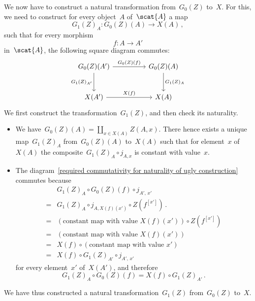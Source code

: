 We now have to construct a natural transformation from~$G_0(Z)$ to~$X$.
For this, we need to construct for every object~$A$ of~$\scat{A}$ a map
\[
	G_1(Z)_A \colon G_0(Z)(A) \to X(A) \,,
\]
such that for every morphism
\[
	f \colon A \to A'
\]
in~$\scat{A}$, the following square diagram commutes:
\begin{equation}
	\label{required commutativity for naturality of ugly construction}
	\begin{tikzcd}[row sep = large, column sep = huge]
		G_0(Z)(A')
		\arrow{r}[above]{G_0(Z)(f)}
		\arrow{d}[left]{G_1(Z)_{A'}}
		&
		G_0(Z)(A)
		\arrow{d}[right]{G_1(Z)_A}
		\\
		X(A')
		\arrow{r}[above]{X(f)}
		&
		X(A)
	\end{tikzcd}
\end{equation}
We first construct the transformation~$G_1(Z)$, and then check its naturality.
\begin{itemize}

	\item
		We have~$G_0(Z)(A) = ∐_{x ∈ X(A)} Z(A, x)$.
		There hence exists a unique map~$G_1(Z)_A$ from~$G_0(Z)(A)$ to~$X(A)$ such that for element~$x$ of~$X(A)$ the composite~$G_1(Z)_A ∘ j_{A, x}$ is constant with value~$x$.

	\item
		The diagram~\eqref{required commutativity for naturality of ugly construction} commutes because
		\begin{align*}
			{}&
			G_1(Z)_A ∘ G_0(Z)(f) ∘ j_{A',\, x'}
			\\
			={}&
			G_1(Z)_A ∘ j_{A, X(f)(x')} ∘ Z(f^{[x']}) \,.
			\\
			={}&
			(\text{constant map with value~$X(f)(x')$}) ∘ Z(f^{[x']})
			\\
			={}&
			(\text{constant map with value~$X(f)(x')$})
			\\
			={}&
			X(f) ∘ (\text{constant map with value~$x'$})
			\\
			={}&
			X(f) ∘ G_1(Z)_{A'} ∘ j_{A',\, x'}
		\end{align*}
		for every element~$x'$ of~$X(A')$, and therefore
		\[
			G_1(Z)_A ∘ G_0(Z)(f) = X(f) ∘ G_1(Z)_{A'} \,.
		\]

\end{itemize}
We have thus constructed a natural transformation~$G_1(Z)$ from~$G_0(Z)$ to~$X$.

